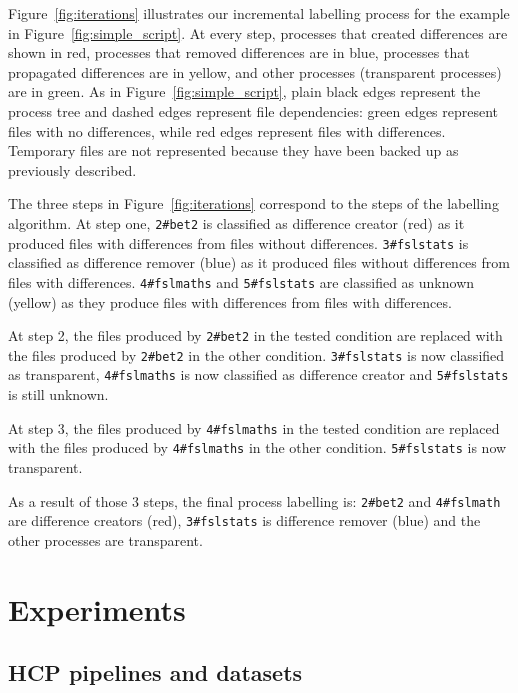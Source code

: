 \documentclass[a4paper,num-refs]{oup-contemporary}
\begin{document}
Figure~\ref{fig:iterations} illustrates our incremental labelling 
process for the example in Figure~\ref{fig:simple_script}. At every 
step, processes that created differences are shown in red, processes that 
removed differences are in blue, processes that propagated differences are in 
yellow, and other processes (transparent processes) are in green. As in 
Figure~\ref{fig:simple_script}, plain black edges represent the process 
tree and dashed edges represent file dependencies: green edges 
represent files with no differences, while red edges represent files with 
differences. Temporary files are not represented because they have been 
backed up as previously described.

The three steps in Figure~\ref{fig:iterations} correspond to the 
steps of the labelling algorithm. At step one, \texttt{2\#bet2} 
is classified as difference creator (red) as it produced files with differences 
from files without differences. \texttt{3\#fslstats} is classified as difference  
remover (blue) as it produced files without differences from files with 
differences. \texttt{4\#fslmaths} and \texttt{5\#fslstats} are classified as 
unknown (yellow) as they produce files with differences from files with 
differences.

At step 2, the files produced by \texttt{2\#bet2} in the tested 
condition are replaced with the files produced by \texttt{2\#bet2} in 
the other condition. \texttt{3\#fslstats} is now classified as 
transparent, \texttt{4\#fslmaths} is now classified as difference creator 
and \texttt{5\#fslstats} is still unknown.

At step 3, the files produced by \texttt{4\#fslmaths} in the tested 
condition are replaced with the files produced by \texttt{4\#fslmaths} 
in the other condition. \texttt{5\#fslstats} is now transparent.
 
As a result of those 3 steps, the final process labelling is: 
\texttt{2\#bet2} and \texttt{4\#fslmath} are difference creators (red), 
\texttt{3\#fslstats} is difference remover (blue) and the other processes 
are transparent.


\section{Experiments}

\subsection{HCP pipelines and datasets}
\end{document}
